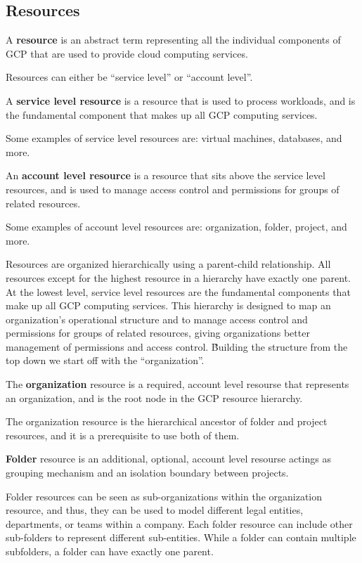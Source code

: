 \subsection{Resources}

\bd[Resource]
A \textbf{resource} is an abstract term representing all the individual components of GCP that are used to provide
cloud computing services.
\ed

Resources can either be ``service level'' or ``account level''.

A \textbf{service level resource} is a resource that is used to process workloads, and is the fundamental component
that makes up all GCP computing services.
\ed

\be
Some examples of service level resources are: virtual machines, databases, and more.
\ee

An \textbf{account level resource} is a resource that sits above the service level resources, and is used to manage
access control and permissions for groups of related resources.
\ed

\be
Some examples of account level resources are: organization, folder, project, and more.
\ee

Resources are organized hierarchically using a parent-child relationship. All resources except for the highest resource
in a hierarchy have exactly one parent. At the lowest level, service level resources are the fundamental components
that make up all GCP computing services. This hierarchy is designed to map an organization's operational structure and
to manage access control and permissions for groups of related resources, giving organizations better management of
permissions and access control. \v

Building the structure from the top down we start off with the ``organization''.

\bd[Organization]
The \textbf{organization} resource is a required, account level resourse that represents an organization, and is the
root node in the GCP resource hierarchy.
\ed

The organization resource is the hierarchical ancestor of folder and project resources, and it is a prerequisite to
use both of them.

\bd[Folder]
\textbf{Folder} resource is an additional, optional, account level resourse actings as grouping mechanism and an
isolation boundary between projects.
\ed

Folder resources can be seen as sub-organizations within the organization resource, and thus, they can be used to model
different legal entities, departments, or teams within a company. Each folder resource can include other sub-folders to
represent different sub-entities. While a folder can contain multiple subfolders, a folder can have exactly one parent.

